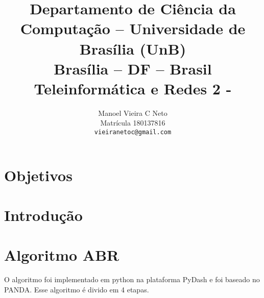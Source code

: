 \documentclass[10pt,twocolumn,letterpaper]{article}
\begin{document}
\title{Departamento de Ciência da Computação -- Universidade de Brasília (UnB)\\
  Brasília -- DF -- Brasil\\
  Teleinformática e Redes 2 - \\
}

\author{
Manoel Vieira C Neto\\ 
Matrícula 180137816\\
{\tt\small vieiranetoc@gmail.com}
\and
}
\maketitle




\begin{abstract}
  

\end{abstract}
   
\section{Objetivos}
    
\section{Introdução}

 




\section{Algoritmo ABR}
O algoritmo foi implementado em python na plataforma PyDash e foi baseado no PANDA\cite{panda}. Esse algoritmo é divido em 4 etapas.
\end{document}
